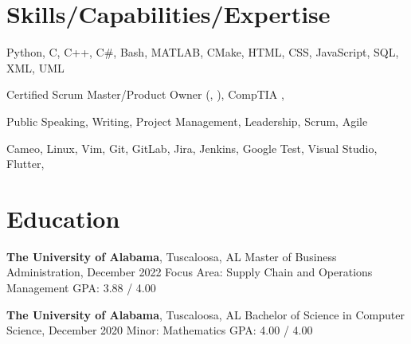 \documentclass[hidelinks, 11pt]{article}
\begin{document}
\makecvtitle
\vspace{0.5mm}

\section{Skills/Capabilities/Expertise}

\begin{description}[widest=Programming Langauges:]
	\item[Programming Languages\normalfont:] Python, C, C++, C\#, Bash, MATLAB, CMake, HTML, CSS, JavaScript, SQL, XML, UML
	\item[Certifications\normalfont:] Certified Scrum Master/Product Owner (, ), CompTIA , 
	\item[Soft Skills\normalfont:] Public Speaking, Writing, Project Management, Leadership, Scrum, Agile
	\item[Tools\normalfont:] Cameo, Linux, Vim, Git, GitLab, Jira, Jenkins, Google Test, Visual Studio, Flutter, 
\end{description}

\section{Education}
\begin{multicols}{2}
	\begin{minipage}{0.5\textwidth}
		\textbf{The University of Alabama}, Tuscaloosa, AL \newline
		Master of Business Administration, December 2022 \newline
		Focus Area: Supply Chain and Operations Management \newline
		GPA: 3.88 / 4.00
	\end{minipage}
	\begin{minipage}{0.5\textwidth}
		\textbf{The University of Alabama}, Tuscaloosa, AL \newline
		Bachelor of Science in Computer Science, December 2020 \newline
		Minor: Mathematics \newline
		GPA: 4.00 / 4.00
	\end{minipage}
\end{multicols}
\end{document}
